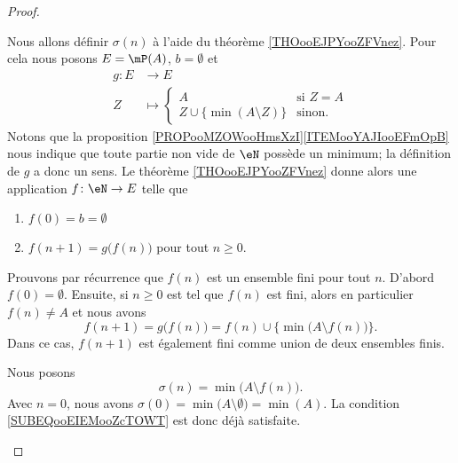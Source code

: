 \begin{proof}
\begin{subproof}
		Nous allons définir \( \sigma(n)\) à l'aide du théorème \ref{THOooEJPYooZFVnez}. Pour cela nous posons \( E=\mP(A)\), \( b=\emptyset\) et
		\begin{equation}
			\begin{aligned}
				g\colon E & \to E                                                  \\
				Z         & \mapsto \begin{cases}
					                    A                             & \text{si } Z=A \\
					                    Z\cup\{ \min(A\setminus Z) \} & \text{sinon. }
				                    \end{cases}
			\end{aligned}
		\end{equation}
		Notons que la proposition \ref{PROPooMZOWooHmsXzI}\ref{ITEMooYAJIooEFmOpB} nous indique que toute partie non vide de \( \eN\) possède un minimum; la définition de \( g\) a donc un sens. Le théorème \ref{THOooEJPYooZFVnez} donne alors une application \( f\colon \eN\to E\) telle que
		\begin{enumerate}
			\item
			      \( f(0)=b=\emptyset\)
			\item
			      \( f(n+1)=g\big( f(n) \big)\) pour tout \( n\geq 0\).
		\end{enumerate}
		Prouvons par récurrence que \( f(n)\) est un ensemble fini pour tout \( n\). D'abord \( f(0)=\emptyset\). Ensuite, si \( n\geq 0\) est tel que \( f(n)\) est fini, alors en particulier \( f(n)\neq A\) et nous avons
		\begin{equation}
			f(n+1)=g\big( f(n) \big)=f(n)\cup\{ \min\big( A\setminus f(n) \big)\}.
		\end{equation}
		Dans ce cas, \( f(n+1)\) est également fini comme union de deux ensembles finis.

		Nous posons
		\begin{equation}        \label{EQooGHQHooRnXDdo}
			\sigma(n)=\min\big( A\setminus f(n) \big).
		\end{equation}
		Avec \( n=0\), nous avons \( \sigma(0)=\min\big( A\setminus \emptyset \big)=\min(A)\). La condition \eqref{SUBEQooEIEMooZcTOWT} est donc déjà satisfaite.


\end{subproof}
\end{proof}
